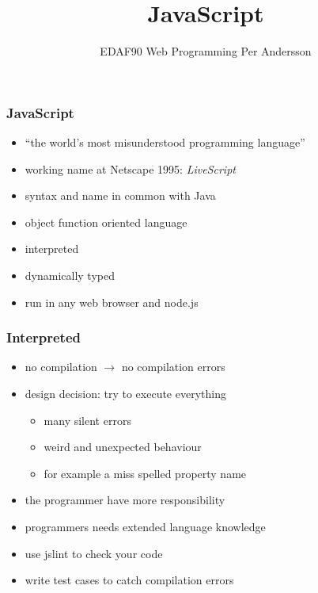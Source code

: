 \documentclass[aspectratio=1610]{beamer}
\title[JavaScript]{JavaScript}
\author[EDAF90]{%
  EDAF90 Web Programming\newline
  Per Andersson}
\begin{document}
\begin{frame}[plain]%
  \titlepage
\end{frame}

\begin{frame}
  \frametitle{JavaScript}

\begin{itemize}
\item ``the world's most misunderstood programming language''
\item working name at Netscape 1995: \emph{LiveScript}
\item syntax and name in common with Java
\item object function oriented language
\item interpreted
\item dynamically typed 
\item run in any web browser and node.js
\end{itemize}
\end{frame}

\begin{frame}
  \frametitle{Interpreted}

\begin{itemize}
\item no compilation $\rightarrow$ no compilation errors
\item design decision: try to execute everything
  \begin{itemize}
  \item many silent errors
  \item weird and unexpected behaviour
  \item for example a miss spelled  property name
  \end{itemize}
\item the programmer have more responsibility
\item programmers needs extended language knowledge
\item use jslint to check your code
\item write test cases to catch compilation errors
\end{itemize}
\end{frame}







\end{document}
